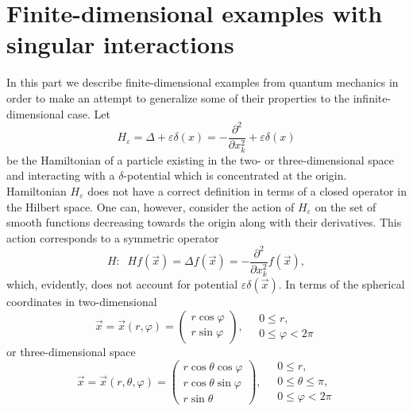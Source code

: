 \documentclass[12pt]{article}
\newcommand{\ve}{\varepsilon}
\begin{document}
\section{Finite-dimensional examples with\\
         singular interactions}
	In this part we describe finite-dimensional examples from quantum mechanics
	in order to make an attempt to generalize some of their properties
	to the infinite-dimensional case.
	Let
\begin{equation*}
    H_{\ve} = \Delta + \ve \delta(x)
	= -\frac{\partial^{2}}{\partial x_{k}^{2}}
	    + \ve \delta(x)
\end{equation*}
	be the Hamiltonian of a particle existing in the two- or three-dimensional space
	and interacting with a
$ \delta $-potential which is concentrated at the origin.
	Hamiltonian
$ H_{\ve} $
	does not have a correct definition in terms of a closed operator
	in the Hilbert space.
	One can, however, consider the action of
$ H_{\ve} $
	on the set of smooth functions decreasing towards the origin along with their derivatives.
	This action corresponds to a symmetric operator
\begin{equation*}
    H: \;\; H f(\vec{x}) = \Delta f(\vec{x}) =
	-\frac{\partial^{2}}{\partial x_{k}^{2}} f(\vec{x}) ,
\end{equation*}
	which, evidently, does not account for potential
$ \ve \delta(\vec{x}) $.
	In terms of the spherical coordinates in two-dimensional
\begin{equation*}
    \vec{x} = \vec{x}(r,\varphi)
    = \begin{pmatrix} r\cos\varphi\\
        r\sin\varphi
        \end{pmatrix}, \quad
    \begin{array}{l}
	0 \leq r,\\ 0 \leq\varphi < 2\pi
    \end{array}
\end{equation*}
	or three-dimensional space
\begin{equation}
\label{sphchange}
    \vec{x} = \vec{x}(r,\theta,\varphi)
    = \begin{pmatrix} r\cos\theta \cos\varphi\\
        r\cos\theta \sin\varphi\\
        r\sin\theta
        \end{pmatrix}, \quad
    \begin{array}{l}
	0 \leq r, \\
	0 \leq\theta\leq\pi,\\
	0 \leq\varphi < 2\pi
    \end{array}
\end{equation}
\end{document}
